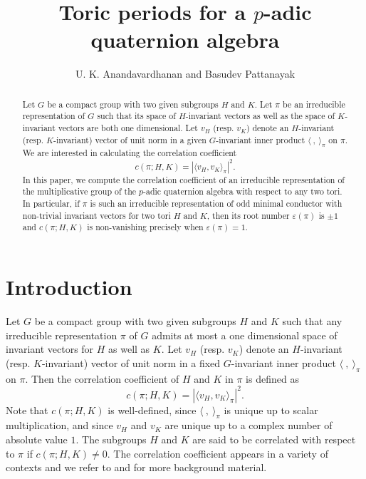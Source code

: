 \documentclass[12pt]{amsart}
\theoremstyle{definition}
\theoremstyle{remark}
\begin{document}
\title[Toric periods for a $p$-adic quaternion algebra]{Toric periods for a $p$-adic quaternion algebra}
\author{U. K. Anandavardhanan and Basudev Pattanayak}

\address{Department of Mathematics, Indian Institute of Technology Bombay, Mumbai - 400076, India.}

\address{Department of Mathematics, Indian Institute of Technology Bombay, Mumbai - 400076, India.}


\date{}

\begin{abstract}
Let $G$ be a compact group with two given subgroups $H$ and $K$. Let $\pi$ be an irreducible representation of $G$ such that its space of $H$-invariant vectors as well as the space of $K$-invariant vectors are both one dimensional. Let $v_H$ (resp. $v_K$) denote an $H$-invariant (resp. $K$-invariant) vector of unit norm in a given $G$-invariant inner product $\langle ~,~ \rangle_\pi$ on $\pi$. We are interested in calculating the correlation coefficient 
\[c(\pi;H,K) = |\langle v_H,v_K \rangle_\pi|^2.\]
In this paper, we compute the correlation coefficient of an irreducible representation of the multiplicative group of the $p$-adic quaternion algebra with respect to any two tori. In particular, if $\pi$ is such an irreducible representation of odd minimal conductor with non-trivial invariant vectors for two tori $H$ and $K$, then its root number $\varepsilon(\pi)$ is $\pm 1$ and $c(\pi; H, K)$ is non-vanishing precisely when $\varepsilon(\pi) = 1$. 
\end{abstract}

\maketitle

\section{Introduction}\label{introduction}\label{intro}

Let $G$ be a compact group with two given subgroups $H$ and $K$ such that any irreducible representation $\pi$ of $G$ admits at most a one dimensional space of invariant vectors for $H$ as well as $K$. Let $v_H$ (resp. $v_K$) denote an $H$-invariant (resp. $K$-invariant) vector of unit norm in a fixed $G$-invariant inner product $\langle ~,~ \rangle_\pi$ on $\pi$. Then the correlation coefficient of $H$ and $K$ in $\pi$ is defined as
\[c(\pi;H,K) = |\langle v_H,v_K \rangle_\pi|^2.\] 
Note that $c(\pi;H,K)$ is well-defined, since $\langle~,~\rangle_\pi$ is unique up to scalar multiplication, and since $v_H$ and $v_K$ are unique up to a complex number of absolute value $1$. The subgroups $H$ and $K$ are said to be correlated with respect to $\pi$ if $c(\pi;H,K) \neq 0$. The correlation coefficient appears in a variety of contexts and we refer to \cite[\S 8, \S 9]{gro91} and \cite{rob99} for more background material.
\end{document}
